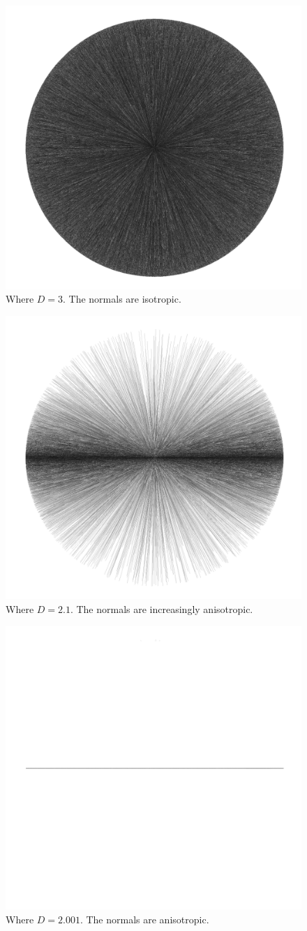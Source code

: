 \documentclass[12pt]{article}
\begin{document}
\begin{figure} 
\centering
\label{fig2}
  \includegraphics[width = 3 in]{3.png}
  \caption{
Where $D = 3$.
The normals are isotropic.
}
\end{figure}

\begin{figure} 
\centering
\label{fig3}
  \includegraphics[width = 3 in]{2.1.png}
  \caption{
Where $D = 2.1$.
The normals are increasingly anisotropic.
}
\end{figure}

\begin{figure} 
\centering
\label{fig4}
  \includegraphics[width = 3 in]{2.001.png}
  \caption{
Where $D = 2.001$.
The normals are anisotropic.
}
\end{figure}
\end{document}
